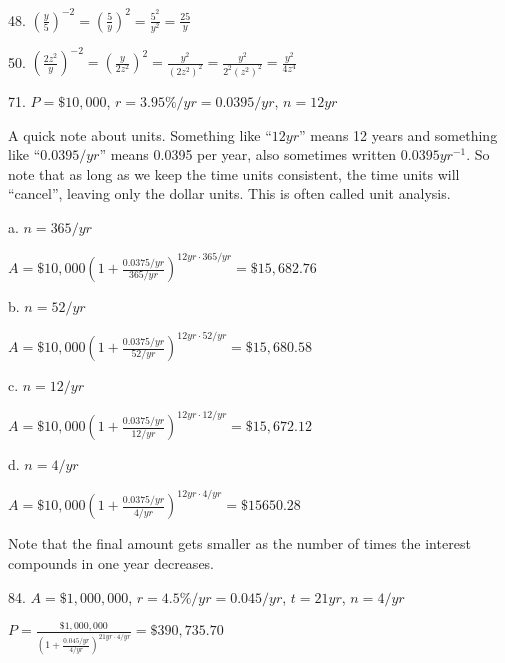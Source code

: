 \documentclass[letterpaper]{article}
\begin{document}
\bigskip

48. $\left(\frac{y}{5}\right)^{-2}=\left(\frac{5}{y}\right)^2=
    \frac{5^2}{y^2}=\frac{25}{y}$

\bigskip

50. $\left(\frac{2z^2}{y}\right)^{-2}=\left(\frac{y}{2z^2}\right)^2=
    \frac{y^2}{(2z^2)^2}=\frac{y^2}{2^2(z^2)^2}=\frac{y^2}{4z^4}$

\bigskip

71. $P=\$10,000$, $r=3.95\%/yr=0.0395/yr$, $n=12yr$

\bigskip

A quick note about units.  Something like ``$12yr$'' means 12 years and
something like ``$0.0395/yr$'' means 0.0395 per year, also sometimes written
$0.0395 yr^{-1}$.  So note that as long as we keep the time units consistent,
the time units will ``cancel'', leaving only the dollar units.  This is often
called unit analysis.

\bigskip

a. $n=365/yr$

\bigskip

$A=\$10,000\left(1+\frac{0.0375/yr}{365/yr}\right)^{12yr\cdot365/yr}=\$15,682.76$

\bigskip

b. $n=52/yr$

\bigskip

$A=\$10,000\left(1+\frac{0.0375/yr}{52/yr}\right)^{12yr\cdot52/yr}=\$15,680.58$

\bigskip

c. $n=12/yr$

\bigskip

$A=\$10,000\left(1+\frac{0.0375/yr}{12/yr}\right)^{12yr\cdot12/yr}=\$15,672.12$

\bigskip

d. $n=4/yr$

\bigskip

$A=\$10,000\left(1+\frac{0.0375/yr}{4/yr}\right)^{12yr\cdot4/yr}=\$15650.28$

\bigskip

Note that the final amount gets smaller as the number of times the interest
compounds in one year decreases.

\bigskip

84. $A=\$1,000,000$, $r=4.5\%/yr=0.045/yr$, $t=21yr$, $n=4/yr$

\bigskip

$P=\frac{\$1,000,000}{\left(1+\frac{0.045/yr}{4/yr}\right)^{21yr\cdot4/yr}}=
    \$390,735.70$
\end{document}
